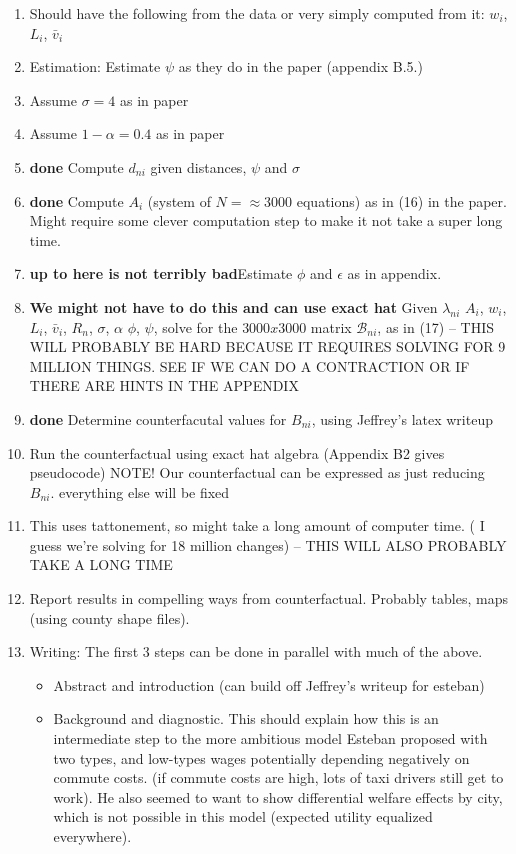 \documentclass{article}
\begin{document}
\begin{enumerate}
    \item Should have the following from the data or very simply computed from it: $w_i$, $L_i$, $\bar v_i$
    \item Estimation: Estimate $\psi$ as they do in the paper (appendix B.5.)
    \item Assume $\sigma = 4$ as in paper
    \item Assume $1-\alpha = 0.4$ as in paper
    \item \textbf{done} Compute $d_{ni}$ given distances, $\psi$ and $\sigma$
    \item \textbf{done} Compute $A_i$ (system of $N = \approx 3000$ equations) as in (16) in the paper. Might require some clever computation step to make it not take a super long time.
    \item \textbf{up to here is not terribly bad}Estimate $\phi$ and $\epsilon$ as in appendix. 
    \item \textbf{We might not have to do this and can use exact hat} Given $\lambda_{ni}$ $A_i$, $w_i$, $L_i$, $\bar v_i$, $R_n$, $\sigma$, $\alpha$ $\phi$, $\psi$, solve for the $3000x3000$ matrix $\mathcal{B}_{ni}$, as in (17) -- THIS WILL PROBABLY BE HARD BECAUSE IT REQUIRES SOLVING FOR 9 MILLION THINGS. SEE IF WE CAN DO A CONTRACTION OR IF THERE ARE HINTS IN THE APPENDIX
    \item \textbf{done} Determine counterfacutal values for $B_{ni}$, using Jeffrey's latex writeup
    \item Run the counterfactual using exact hat algebra (Appendix B2 gives pseudocode)  NOTE! Our counterfactual can be expressed as just reducing $B_{ni}$. everything else will be fixed
    \item This uses tattonement, so might take a long amount of computer time. ( I guess we're solving for 18 million changes) -- THIS WILL ALSO PROBABLY TAKE A LONG TIME
    \item  Report results in compelling ways from counterfactual. Probably tables, maps (using county shape files). 
    \item Writing: The first 3 steps can be done in parallel with much of the above.
    \begin{itemize}
        \item Abstract and introduction (can build off Jeffrey's writeup for esteban)
        \item Background and diagnostic. This should explain how this is an intermediate step to the more ambitious model Esteban proposed with two types, and low-types wages potentially depending negatively on commute costs.  (if commute costs are high, lots of taxi drivers still get to work). He also seemed to want to show differential welfare effects by city, which is not possible in this model (expected utility equalized everywhere).

\end{itemize}
\end{enumerate}
\end{document}
